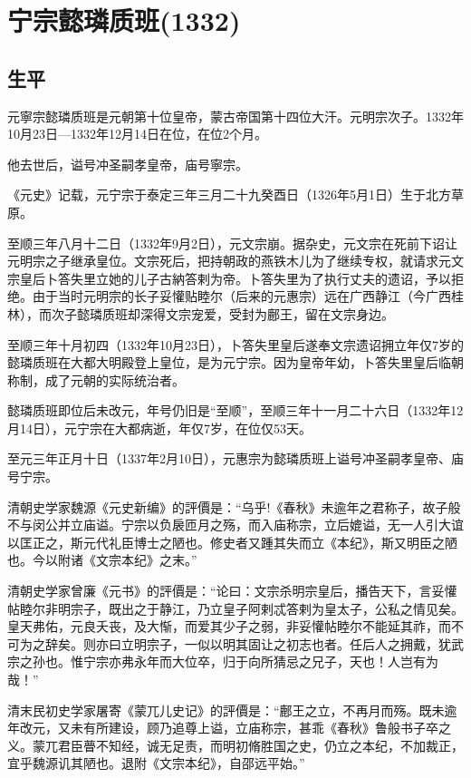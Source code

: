 
\section{宁宗懿璘质班\tiny(1332)}

\subsection{生平}

元寧宗懿璘质班是元朝第十位皇帝，蒙古帝国第十四位大汗。元明宗次子。1332年10月23日—1332年12月14日在位，在位2个月。

他去世后，谥号冲圣嗣孝皇帝，庙号寧宗。

《元史》记载，元宁宗于泰定三年三月二十九癸酉日（1326年5月1日）生于北方草原。

至顺三年八月十二日（1332年9月2日），元文宗崩。据杂史，元文宗在死前下诏让元明宗之子继承皇位。文宗死后，把持朝政的燕铁木儿为了继续专权，就请求元文宗皇后卜答失里立她的儿子古納答剌为帝。卜答失里为了执行丈夫的遗诏，予以拒绝。由于当时元明宗的长子妥懽贴睦尔（后来的元惠宗）远在广西静江（今广西桂林），而次子懿璘质班却深得文宗宠爱，受封为鄜王，留在文宗身边。

至顺三年十月初四（1332年10月23日），卜答失里皇后遂奉文宗遗诏拥立年仅7岁的懿璘质班在大都大明殿登上皇位，是为元宁宗。因为皇帝年幼，卜答失里皇后临朝称制，成了元朝的实际统治者。

懿璘质班即位后未改元，年号仍旧是“至顺”，至顺三年十一月二十六日（1332年12月14日），元宁宗在大都病逝，年仅7岁，在位仅53天。

至元三年正月十日（1337年2月10日），元惠宗为懿璘质班上谥号冲圣嗣孝皇帝、庙号宁宗。

清朝史学家魏源《元史新编》的評價是：“乌乎!《春秋》未逾年之君称子，故子般不与闵公并立庙谥。宁宗以负扆匝月之殇，而入庙称宗，立后媲谥，无一人引大谊以匡正之，斯元代礼臣博士之陋也。修史者又踵其失而立《本纪》，斯又明臣之陋也。今以附诸《文宗本纪》之末。”

清朝史学家曾廉《元书》的評價是：“论曰：文宗杀明宗皇后，播告天下，言妥懽帖睦尔非明宗子，既出之于静江，乃立皇子阿剌忒答剌为皇太子，公私之情见矣。皇天弗佑，元良夭丧，及大惭，而爱其少子之弱，非妥懽帖睦尔不能延其祚，而不可为之辞矣。则亦曰立明宗子，一似以明其固让之初志也者。任后人之拥戴，犹武宗之孙也。惟宁宗亦弗永年而大位卒，归于向所猜忌之兄子，天也！人岂有为哉！”

清末民初史学家屠寄《蒙兀儿史记》的評價是：“鄜王之立，不再月而殇。既未逾年改元，又未有所建设，顾乃追尊上谥，立庙称宗，甚乖《春秋》鲁般书子卒之义。蒙兀君臣瞢不知经，诚无足责，而明初脩胜国之史，仍立之本纪，不加裁正，宜乎魏源讥其陋也。退附《文宗本纪》，自邵远平始。”

